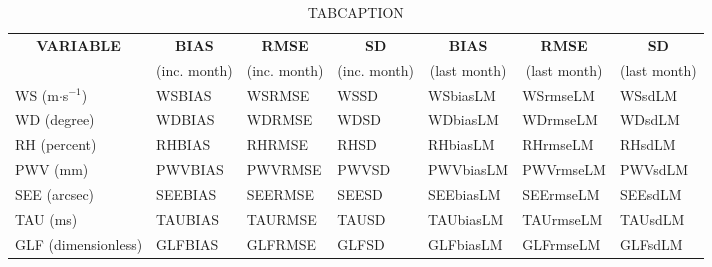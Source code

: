 \begin{table}[h!]
\begin{center}
\begin{tabular}{|l|l|l|l|l|l|l|}
\hline
\multicolumn{1}{|c|}{\cellcolor[HTML]{C0C0C0}\textbf{VARIABLE}} & \multicolumn{1}{c|}{\cellcolor[HTML]{C0C0C0}\textbf{BIAS}} & \multicolumn{1}{c|}{\cellcolor[HTML]{C0C0C0}\textbf{RMSE}} & \multicolumn{1}{c|}{\cellcolor[HTML]{C0C0C0}\textbf{SD}} & \multicolumn{1}{c|}{\cellcolor[HTML]{C0C0C0}\textbf{BIAS}} & \multicolumn{1}{c|}{\cellcolor[HTML]{C0C0C0}\textbf{RMSE}} & \multicolumn{1}{c|}{\cellcolor[HTML]{C0C0C0}\textbf{SD}}\\
\multicolumn{1}{|c|}{\cellcolor[HTML]{C0C0C0}} & \multicolumn{1}{c|}{\cellcolor[HTML]{C0C0C0}(inc. month)} & \multicolumn{1}{c|}{\cellcolor[HTML]{C0C0C0}(inc. month)} & \multicolumn{1}{c|}{\cellcolor[HTML]{C0C0C0}(inc. month)} & \multicolumn{1}{c|}{\cellcolor[HTML]{C0C0C0}(last month)} & \multicolumn{1}{c|}{\cellcolor[HTML]{C0C0C0}(last month)} & \multicolumn{1}{c|}{\cellcolor[HTML]{C0C0C0}(last month)}\\\hline
\cellcolor[HTML]{C0C0C0}WS (m$\cdot$s$^{-1}$) & WSBIAS  & WSRMSE  & WSSD  & WSbiasLM     & WSrmseLM     & WSsdLM\\
\cellcolor[HTML]{C0C0C0}WD (degree)           & WDBIAS  & WDRMSE  & WDSD  & WDbiasLM     & WDrmseLM     & WDsdLM\\
\cellcolor[HTML]{C0C0C0}RH (percent)          & RHBIAS  & RHRMSE  & RHSD  & RHbiasLM     & RHrmseLM     & RHsdLM\\
\cellcolor[HTML]{C0C0C0}PWV (mm)              & PWVBIAS & PWVRMSE & PWVSD & PWVbiasLM    & PWVrmseLM    & PWVsdLM\\
\cellcolor[HTML]{C0C0C0}SEE (arcsec)          & SEEBIAS & SEERMSE & SEESD & SEEbiasLM    & SEErmseLM    & SEEsdLM\\
\cellcolor[HTML]{C0C0C0}TAU (ms)              & TAUBIAS & TAURMSE & TAUSD & TAUbiasLM    & TAUrmseLM    & TAUsdLM\\
\cellcolor[HTML]{C0C0C0}GLF (dimensionless)   & GLFBIAS & GLFRMSE & GLFSD & GLFbiasLM    & GLFrmseLM    & GLFsdLM\\
\hline
\end{tabular}
\caption{TABCAPTION}\label{MYLABEL}
\end{center}
\end{table}

